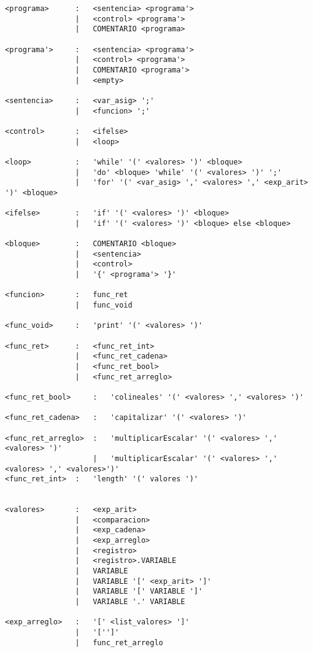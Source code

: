 \begin{verbatim}
<programa>      :   <sentencia> <programa'>   
                |   <control> <programa'>   
                |   COMENTARIO <programa>   

<programa'>     :   <sentencia> <programa'>   
                |   <control> <programa'>   
                |   COMENTARIO <programa'>   
                |   <empty>

<sentencia>     :   <var_asig> ';'
                |   <funcion> ';'

<control>       :   <ifelse>
                |   <loop>

<loop>          :   'while' '(' <valores> ')' <bloque>
                |   'do' <bloque> 'while' '(' <valores> ')' ';' 
                |   'for' '(' <var_asig> ',' <valores> ',' <exp_arit> ')' <bloque>

<ifelse>        :   'if' '(' <valores> ')' <bloque>
                |   'if' '(' <valores> ')' <bloque> else <bloque>

<bloque>        :   COMENTARIO <bloque>
                |   <sentencia>
                |   <control>
                |   '{' <programa'> '}'

<funcion>       :   func_ret
                |   func_void

<func_void>     :   'print' '(' <valores> ')'

<func_ret>      :   <func_ret_int>
                |   <func_ret_cadena>
                |   <func_ret_bool>
                |   <func_ret_arreglo>

<func_ret_bool>     :   'colineales' '(' <valores> ',' <valores> ')'

<func_ret_cadena>   :   'capitalizar' '(' <valores> ')'

<func_ret_arreglo>  :   'multiplicarEscalar' '(' <valores> ',' <valores> ')'
                    |   'multiplicarEscalar' '(' <valores> ',' <valores> ',' <valores>')'
<func_ret_int>  :   'length' '(' valores ')'


<valores>       :   <exp_arit>
                |   <comparacion>
                |   <exp_cadena>
                |   <exp_arreglo>
                |   <registro>
                |   <registro>.VARIABLE
                |   VARIABLE
                |   VARIABLE '[' <exp_arit> ']' 
                |   VARIABLE '[' VARIABLE ']' 
                |   VARIABLE '.' VARIABLE 

<exp_arreglo>   :   '[' <list_valores> ']'
                |   '['']'
                |   func_ret_arreglo


\end{verbatim}
